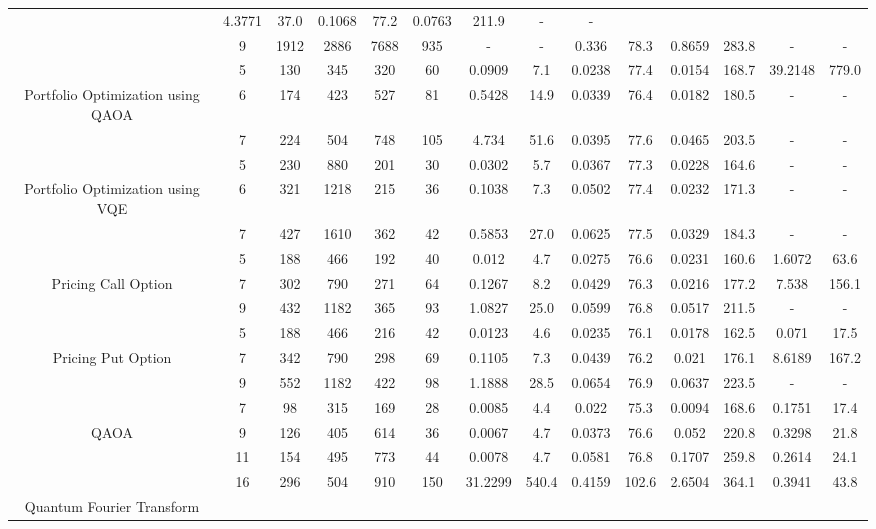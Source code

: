 \begin{table}[htb]
{\begin{tabular}{|c|c|c|c|c|c|c|c|c|c|c|c|c|c|}
 & 4.3771 & 37.0
 & 0.1068 & 77.2
 & 0.0763 & 211.9
 & - & -
 \\
 & 
9 & 1912 & 2886 & 7688 & 935
 & - & -
 & 0.336 & 78.3
 & 0.8659 & 283.8
 & - & -
 \\
\hline
 & 
5 & 130 & 345 & 320 & 60
 & 0.0909 & 7.1
 & 0.0238 & 77.4
 & 0.0154 & 168.7
 & 39.2148 & 779.0
 \\
Portfolio Optimization using QAOA & 
6 & 174 & 423 & 527 & 81
 & 0.5428 & 14.9
 & 0.0339 & 76.4
 & 0.0182 & 180.5
 & - & -
 \\
 & 
7 & 224 & 504 & 748 & 105
 & 4.734 & 51.6
 & 0.0395 & 77.6
 & 0.0465 & 203.5
 & - & -
 \\
\hline
 & 
5 & 230 & 880 & 201 & 30
 & 0.0302 & 5.7
 & 0.0367 & 77.3
 & 0.0228 & 164.6
 & - & -
 \\
Portfolio Optimization using VQE & 
6 & 321 & 1218 & 215 & 36
 & 0.1038 & 7.3
 & 0.0502 & 77.4
 & 0.0232 & 171.3
 & - & -
 \\
 & 
7 & 427 & 1610 & 362 & 42
 & 0.5853 & 27.0
 & 0.0625 & 77.5
 & 0.0329 & 184.3
 & - & -
 \\
\hline
 & 
5 & 188 & 466 & 192 & 40
 & 0.012 & 4.7
 & 0.0275 & 76.6
 & 0.0231 & 160.6
 & 1.6072 & 63.6
 \\
Pricing Call Option & 
7 & 302 & 790 & 271 & 64
 & 0.1267 & 8.2
 & 0.0429 & 76.3
 & 0.0216 & 177.2
 & 7.538 & 156.1
 \\
 & 
9 & 432 & 1182 & 365 & 93
 & 1.0827 & 25.0
 & 0.0599 & 76.8
 & 0.0517 & 211.5
 & - & -
 \\
\hline
 & 
5 & 188 & 466 & 216 & 42
 & 0.0123 & 4.6
 & 0.0235 & 76.1
 & 0.0178 & 162.5
 & 0.071 & 17.5
 \\
Pricing Put Option & 
7 & 342 & 790 & 298 & 69
 & 0.1105 & 7.3
 & 0.0439 & 76.2
 & 0.021 & 176.1
 & 8.6189 & 167.2
 \\
 & 
9 & 552 & 1182 & 422 & 98
 & 1.1888 & 28.5
 & 0.0654 & 76.9
 & 0.0637 & 223.5
 & - & -
 \\
\hline
 & 
7 & 98 & 315 & 169 & 28
 & 0.0085 & 4.4
 & 0.022 & 75.3
 & 0.0094 & 168.6
 & 0.1751 & 17.4
 \\
QAOA & 
9 & 126 & 405 & 614 & 36
 & 0.0067 & 4.7
 & 0.0373 & 76.6
 & 0.052 & 220.8
 & 0.3298 & 21.8
 \\
 & 
11 & 154 & 495 & 773 & 44
 & 0.0078 & 4.7
 & 0.0581 & 76.8
 & 0.1707 & 259.8
 & 0.2614 & 24.1
 \\
\hline
 & 
16 & 296 & 504 & 910 & 150
 & 31.2299 & 540.4
 & 0.4159 & 102.6
 & 2.6504 & 364.1
 & 0.3941 & 43.8
 \\
Quantum Fourier Transform & 

\end{tabular}}
\end{table}
